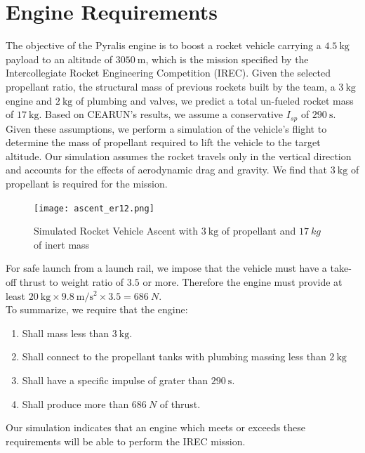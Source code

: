 \documentclass{article}
\begin{document}
\section*{Engine Requirements}
The objective of the Pyralis engine is to boost a rocket vehicle carrying a $\SI{4.5}{\kg}$ payload to an altitude of $\SI{3050}{\metre}$, which is the mission specified by the Intercollegiate Rocket Engineering Competition (IREC). Given the selected propellant ratio,  the structural mass of previous rockets built by the team, a $\SI{3}{\kg}$ engine and $\SI{2}{\kg}$ of plumbing and valves, we predict a total un-fueled rocket mass of $\SI{17}{\kg}$. Based on CEARUN's results, we assume a conservative $I_{sp}$ of $\SI{290}{\second}$. 
Given these assumptions, we perform a simulation of the vehicle's flight to determine the mass of propellant required to lift the vehicle to the target altitude. Our simulation assumes the rocket travels only in the vertical direction and accounts for the effects of aerodynamic drag and gravity. We find that $\SI{3}{\kg}$ of propellant is required for the mission.
\begin{figure}[h!]
\centering
\texttt{[image: ascent\_er12.png]}
\caption{Simulated Rocket Vehicle Ascent with $\SI{3}{\kg}$ of propellant and $\SI{17}{kg}$ of inert mass} 
\label{ascent}
\end{figure}
For safe launch from a launch rail, we impose that the vehicle must have a take-off thrust to weight ratio of $3.5$ or more. Therefore the engine must provide at least $\SI{20}{\kg} \times \SI{9.8}{\metre\per\second\squared} \times 3.5 = \SI{686}{N}$.\\
To summarize, we require that the engine:
\begin{enumerate}
\item Shall mass less than $\SI{3}{\kg}$.
\item Shall connect to the propellant tanks with plumbing massing less than $\SI{2}{\kg}$
\item Shall have a specific impulse of grater than $\SI{290}{\second}$.
\item Shall produce more than $\SI{686}{N}$ of thrust.
\end{enumerate}
Our simulation indicates that an engine which meets or exceeds these requirements will be able to perform the IREC mission.
\end{document}
